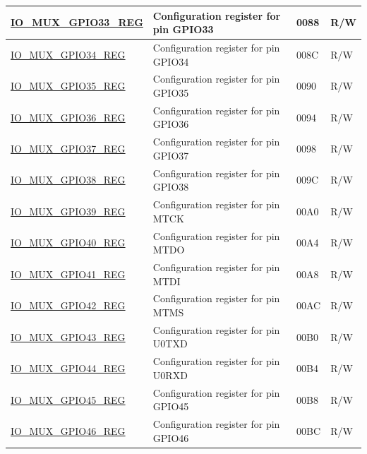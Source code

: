 \documentclass[main.tex]{subfiles}
\begin{document}
\begin{longtable}{ | p{5cm} | p{7.5cm} | p{2cm} | p{1cm} | }
\hyperref[regdesc:IOMUXnREG]{IO\_MUX\_GPIO33\_REG} & Configuration register for pin GPIO33 & \hexprefix{}0088 & R/W \\ \hline
\hyperref[regdesc:IOMUXnREG]{IO\_MUX\_GPIO34\_REG} & Configuration register for pin GPIO34 & \hexprefix{}008C & R/W \\ \hline
\hyperref[regdesc:IOMUXnREG]{IO\_MUX\_GPIO35\_REG} & Configuration register for pin GPIO35 & \hexprefix{}0090 & R/W \\ \hline
\hyperref[regdesc:IOMUXnREG]{IO\_MUX\_GPIO36\_REG} & Configuration register for pin GPIO36 & \hexprefix{}0094 & R/W \\ \hline
\hyperref[regdesc:IOMUXnREG]{IO\_MUX\_GPIO37\_REG} & Configuration register for pin GPIO37 & \hexprefix{}0098 & R/W \\ \hline
\hyperref[regdesc:IOMUXnREG]{IO\_MUX\_GPIO38\_REG} & Configuration register for pin GPIO38 & \hexprefix{}009C & R/W \\ \hline
\hyperref[regdesc:IOMUXnREG]{IO\_MUX\_GPIO39\_REG} & Configuration register for pin MTCK & \hexprefix{}00A0 & R/W \\ \hline
\hyperref[regdesc:IOMUXnREG]{IO\_MUX\_GPIO40\_REG} & Configuration register for pin MTDO & \hexprefix{}00A4 & R/W \\ \hline
\hyperref[regdesc:IOMUXnREG]{IO\_MUX\_GPIO41\_REG} & Configuration register for pin MTDI & \hexprefix{}00A8 & R/W \\ \hline
\hyperref[regdesc:IOMUXnREG]{IO\_MUX\_GPIO42\_REG} & Configuration register for pin MTMS & \hexprefix{}00AC & R/W \\ \hline
\hyperref[regdesc:IOMUXnREG]{IO\_MUX\_GPIO43\_REG} & Configuration register for pin U0TXD & \hexprefix{}00B0 & R/W \\ \hline
\hyperref[regdesc:IOMUXnREG]{IO\_MUX\_GPIO44\_REG} & Configuration register for pin U0RXD & \hexprefix{}00B4 & R/W \\ \hline
\hyperref[regdesc:IOMUXnREG]{IO\_MUX\_GPIO45\_REG} & Configuration register for pin GPIO45 & \hexprefix{}00B8 & R/W \\ \hline
\hyperref[regdesc:IOMUXnREG]{IO\_MUX\_GPIO46\_REG} & Configuration register for pin GPIO46 & \hexprefix{}00BC & R/W \\ \hline
\end{longtable}
\end{document}
